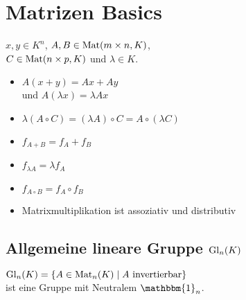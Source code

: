 \section*{Matrizen Basics}

$x,y\in K^n$, $A,B\in\operatorname{Mat}(m\times n,K)$, \\
$C\in\operatorname{Mat}(n\times p, K)$ und $\lambda\in K$.

\begin{itemize}
	\item $A(x+y)=Ax + Ay$\\ und $A(\lambda x) = \lambda Ax$
	\item $\lambda(A\circ C) = (\lambda A)\circ C = A\circ (\lambda C)$
	\item $f_{A+B}=f_A + f_B$
	\item $f_{\lambda A} = \lambda f_A$
	\item $f_{A \circ B} = f_A \circ f_B$
	\item Matrixmultiplikation ist assoziativ und distributiv
\end{itemize}

\subsection*{Allgemeine lineare Gruppe $\operatorname{Gl}_n(K)$}
$\operatorname{Gl}_n(K) = \{A \in \operatorname{Mat}_n(K) \mid A \text{ invertierbar}\}$ \\
ist eine Gruppe mit Neutralem $\mathbbm{1}_n$.
